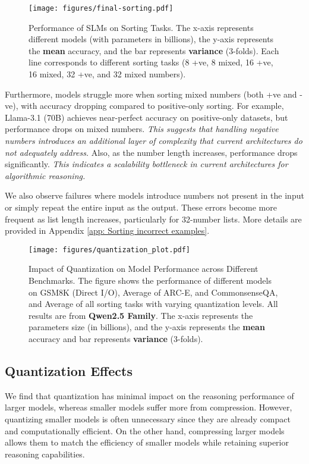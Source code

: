 \begin{figure}[ht]
    \centering
    \texttt{[image: figures/final-sorting.pdf]}
        \caption{Performance of SLMs on Sorting Tasks. The x-axis represents different models (with parameters in billions), the y-axis represents the \textbf{mean} accuracy, and the bar represents \textbf{variance} (3-folds). Each line corresponds to different sorting tasks (8 +ve, 8 mixed, 16 +ve, 16 mixed, 32 +ve, and 32 mixed numbers).}
    \label{fig:sorting}
\end{figure}


Furthermore, models struggle more when sorting mixed numbers (both +ve and -ve), with accuracy dropping compared to positive-only sorting. For example, Llama-3.1 (70B) achieves near-perfect accuracy on positive-only datasets, but performance drops on mixed numbers. \textit{This suggests that handling negative numbers introduces an additional layer of complexity that current architectures do not adequately address.} Also, as the number length increases, performance drops significantly. \textit{This indicates a scalability bottleneck in current architectures for algorithmic reasoning.}


We also observe failures where models introduce numbers not present in the input or simply repeat the entire input as the output. These errors become more frequent as list length increases, particularly for 32-number lists. More details are provided in Appendix \ref{app: Sorting incorrect examples}.

\begin{figure*}[ht]
    \centering
    \texttt{[image: figures/quantization\_plot.pdf]}
            \caption{Impact of Quantization on Model Performance across Different Benchmarks. The figure shows the performance of different models on GSM8K (Direct I/O), Average of ARC-E, and CommonsenseQA, and Average of all sorting tasks with varying quantization levels. All results are from \textbf{Qwen2.5 Family}. The x-axis represents the parameters size (in billions), and the y-axis represents the \textbf{mean} accuracy and bar represents \textbf{variance} (3-folds).}
    \label{fig:quant}
\end{figure*}

\subsection{Quantization Effects}
We find that quantization has minimal impact on the reasoning performance of larger models, whereas smaller models suffer more from compression. However, quantizing smaller models is often unnecessary since they are already compact and computationally efficient. On the other hand, compressing larger models allows them to match the efficiency of smaller models while retaining superior reasoning capabilities.

